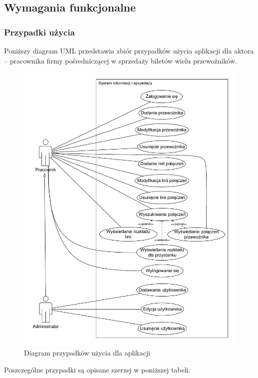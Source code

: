 \documentclass[10pt,a4paper]{article}
\begin{document}
\subsection{Wymagania funkcjonalne}

\subsubsection*{Przypadki użycia}
Poniższy diagram UML przedstawia zbiór przypadków użycia aplikacji dla aktora -- pracownika firmy pośredniczącej w sprzedaży biletów wielu przewoźników.
\begin{figure}[H]
	\centering
	\includegraphics[width=12cm]{use-case.pdf}
	\caption{Diagram przypadków użycia dla aplikacji}
\end{figure}
Poszczególne przypadki są opisane szerzej w poniższej tabeli:
\end{document}

